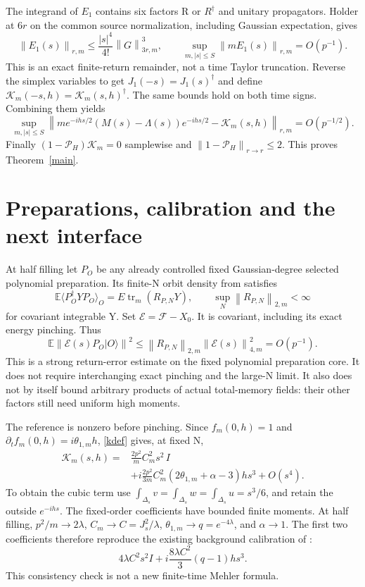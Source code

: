 \documentclass[11pt]{article}
\newcommand{\E}{\mathbb E}
\newcommand{\tr}{\operatorname{tr}}
\newcommand{\Pin}{\mathcal P_H}
\newcommand{\norm}[1]{\left\lVert#1\right\rVert}
\begin{document}
The integrand of $E_1$ contains six factors R or $R^\dagger$
and unitary propagators. Holder at $6r$ on the common source
normalization, including Gaussian expectation, gives
\begin{equation}\label{E1}
 \norm{E_1(s)}_{r,m}\le\frac{|s|^4}{4!}\norm G_{3r,m}^3,
 \qquad \sup_{m,|s|\le S}\norm{mE_1(s)}_{r,m}=O(p^{-1}).
\end{equation}
This is an exact finite-return remainder, not a time Taylor
truncation. Reverse the simplex variables to get
$J_1(-s)=J_1(s)^\dagger$ and define
$\mathcal K_m(-s,h)=\mathcal K_m(s,h)^\dagger$.
The same bounds hold on both time signs. Combining them yields
\begin{equation}\label{unpinched}
 \sup_{m,|s|\le S}
 \norm{m e^{-ihs/2}(M(s)-\Lambda(s))e^{-ihs/2}
                         -\mathcal K_m(s,h)}_{r,m}=O(p^{-1/2}).
\end{equation}
Finally $(1-\Pin)\mathcal K_m=0$ samplewise and
$\norm{1-\Pin}_{r\to r}\le2$. This proves Theorem~\ref{main}.

\newpage
\section{Preparations, calibration and the next interface}
At half filling let $P_O$ be any already controlled fixed
Gaussian-degree selected polynomial preparation. Its finite-N
orbit density from \cite{density} satisfies
\[
 \E\langle P_O^\dagger YP_O\rangle_O=E\tr_m(R_{P,N}Y),
 \qquad\sup_N\norm{R_{P,N}}_{2,m}<\infty
\]
for covariant integrable Y. Set $\mathcal E=\mathcal F-X_0$.
It is covariant, including its exact energy pinching. Thus
\begin{equation}\label{prep}
 \E\norm{\mathcal E(s)P_O|O\rangle}^2
 \le\norm{R_{P,N}}_{2,m}\norm{\mathcal E(s)}_{4,m}^2
 =O(p^{-1}).
\end{equation}
This is a strong return-error estimate on the fixed polynomial
preparation core. It does not require interchanging exact
pinching and the large-N limit. It also does not by itself
bound arbitrary products of actual total-memory fields: their
other factors still need uniform high moments.

The reference is nonzero before pinching. Since
$f_m(0,h)=1$ and $\partial_tf_m(0,h)=i\theta_{1,m}h$,
\eqref{kdef} gives, at fixed N,
\begin{align}
 \mathcal K_m(s,h)
  ={}&\frac{2p^2}{m}C_m^2s^2\,I\nonumber\\
    &+i\frac{2p^2}{3m}C_m^2
           (2\theta_{1,m}+\alpha-3)hs^3+O(s^4).
 \label{calibration}
\end{align}
To obtain the cubic term use
$\int_{\Delta_s}v=\int_{\Delta_s}w=\int_{\Delta_s}u=s^3/6$,
and retain the outside $e^{-ihs}$. The fixed-order coefficients
have bounded finite moments. At half filling,
$p^2/m\to2\lambda$, $C_m\to C=J_s^2/\lambda$,
$\theta_{1,m}\to q=e^{-4\lambda}$, and $\alpha\to1$.
The first two coefficients therefore reproduce the existing
background calibration of \cite{background}:
\[
 4\lambda C^2s^2I+i\frac{8\lambda C^2}{3}(q-1)hs^3.
\]
This consistency check is not a new finite-time Mehler formula.
\end{document}
